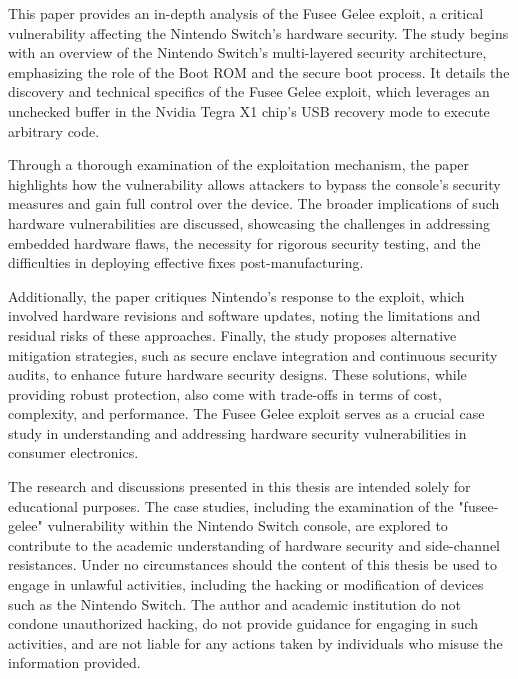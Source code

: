 \beforeabstract
{}

This paper provides an in-depth analysis of the Fusee Gelee exploit, a critical vulnerability affecting the Nintendo Switch's hardware security. The study begins with an overview of the Nintendo Switch's multi-layered security architecture, emphasizing the role of the Boot ROM and the secure boot process. It details the discovery and technical specifics of the Fusee Gelee exploit, which leverages an unchecked buffer in the Nvidia Tegra X1 chip's USB recovery mode to execute arbitrary code.

Through a thorough examination of the exploitation mechanism, the paper highlights how the vulnerability allows attackers to bypass the console's security measures and gain full control over the device. The broader implications of such hardware vulnerabilities are discussed, showcasing the challenges in addressing embedded hardware flaws, the necessity for rigorous security testing, and the difficulties in deploying effective fixes post-manufacturing.

Additionally, the paper critiques Nintendo's response to the exploit, which involved hardware revisions and software updates, noting the limitations and residual risks of these approaches. Finally, the study proposes alternative mitigation strategies, such as secure enclave integration and continuous security audits, to enhance future hardware security designs. These solutions, while providing robust protection, also come with trade-offs in terms of cost, complexity, and performance. The Fusee Gelee exploit serves as a crucial case study in understanding and addressing hardware security vulnerabilities in consumer electronics.


The research and discussions presented in this thesis are intended solely for educational purposes. The case studies, including the examination of the "fusee-gelee" vulnerability within the Nintendo Switch console, are explored to contribute to the academic understanding of hardware security and side-channel resistances. Under no circumstances should the content of this thesis be used to engage in unlawful activities, including the hacking or modification of devices such as the Nintendo Switch. The author and academic institution do not condone unauthorized hacking, do not provide guidance for engaging in such activities, and are not liable for any actions taken by individuals who misuse the information provided.

\afterpreface\afterabstract